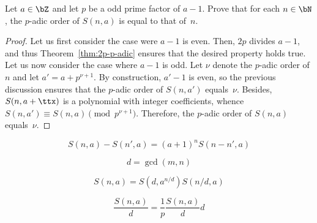  \begin{exercise} \label{exo:p-p-adic}
   Let $a \in \bZ$ and let $p$ be a odd prime factor of $a - 1$.
   Prove that for each $n \in \bN$, the $p$-adic order of $S(n, a)$ is equal to that of~$n$.
 \end{exercise}

 \begin{proof}
   Let us first consider the case were $a - 1$ is even.
   Then, $2p$ divides $a - 1$,
   and thus Theorem~\ref{thm:2p-p-adic} ensures that the desired property holds true.
   Let us now consider the case where $a - 1$ is odd.
   Let $\nu$ denote the $p$-adic order of $n$ and let $a' = a + p^{\nu + 1}$.
   By construction, $a' - 1$ is even,
   so the previous discussion ensures that the $p$-adic order of $S(n, a')$ equals~$\nu$.
   Besides, $S(n, a + \ttx)$ is a polynomial with integer coefficients,
   whence $S(n, a') \equiv S(n, a) \pmod{p^{\nu + 1}}$.
   Therefore, the $p$-adic order of $S(n, a)$ equals~$\nu$.   
 \end{proof}
 
 



$$
S(n, a) - S(n', a) = {(a + 1)}^n S(n - n', a)
$$

$$
d = \gcd(m, n)
$$

$$
S(n, a) = S(d, a^{n/d}) S(n/d, a)
$$

 
$$
\frac{S(n, a)}{d}  = \frac{1}{p} \frac{S(n, a)}{d} d
$$



   

